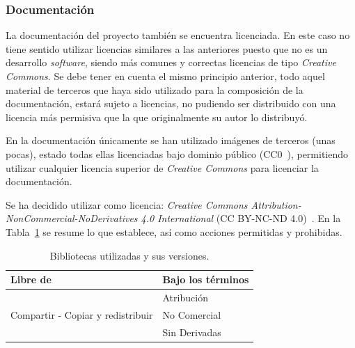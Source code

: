 
\subsubsection{Documentación}
La documentación del proyecto también se encuentra licenciada. En este caso no tiene sentido utilizar licencias similares a las anteriores puesto que no es un desarrollo \textit{software}, siendo más comunes y correctas licencias de tipo \textit{Creative Commons}. Se debe tener en cuenta el mismo principio anterior, todo aquel material de terceros que haya sido utilizado para la composición de la documentación, estará sujeto a licencias, no pudiendo ser distribuido con una licencia más permisiva que la que originalmente su autor lo distribuyó. 

En la documentación únicamente se han utilizado imágenes de terceros (unas pocas), estado todas ellas licenciadas bajo dominio público (CC0~\cite{CC0}), permitiendo utilizar cualquier licencia superior de \textit{Creative Commons} para licenciar la documentación.

Se ha decidido utilizar como licencia: \textit{Creative Commons Attribution-NonCommercial-NoDerivatives 4.0 International} (CC BY-NC-ND 4.0)~\cite{CCBYNCND40}.  En la Tabla~\ref{tab:licencia-documentacion} se resume lo que establece, así como acciones permitidas y prohibidas.

\begin{table}[H]
\centering
\begin{tabular}{ll}
	\toprule
	\textbf{Libre de} & \textbf{Bajo los términos}\\
	\midrule
	\multirow{3}{*}{Compartir - Copiar y redistribuir}   &Atribución\\
	    & No Comercial   \\  
	   & Sin Derivadas  \\ 
	\bottomrule
\end{tabular}
\caption{Bibliotecas utilizadas y sus versiones.}\label{tab:licencia-documentacion}
\end{table}
